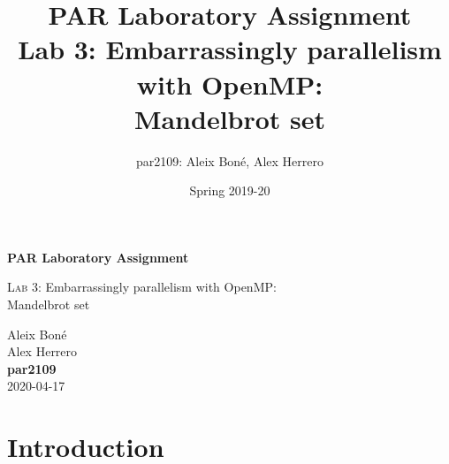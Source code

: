 

\usepackage[justification=centering]{caption}
\usepackage{subcaption}
\usepackage{graphicx}
\usepackage{enumitem}
\usepackage{lipsum}

\usepackage{siunitx}
\usepackage{hyphenat}

\usepackage{xcolor}


\usepackage[newfloat]{minted}
\captionsetup[listing]{position=top}


\renewcommand\theadfont{\bfseries}

\title{
    PAR Laboratory Assignment\\
    Lab 3: Embarrassingly parallelism with OpenMP:\\ Mandelbrot set
}

\author{
    par2109:
    Aleix Boné,
    Alex Herrero
}

\date{
    Spring 2019-20
}



\thispagestyle{empty}
\clearpage
\setcounter{page}{-1}

\begin{titlepage}
{
    \centering
    \null
    \vfill
    {\Huge \bfseries PAR Laboratory Assignment\par}
    \vspace{3em}
    {\Large {\scshape Lab 3:} Embarrassingly parallelism with OpenMP: \\ Mandelbrot set \par}
    \vfill
\begin{center}
\end{center}
    \vspace{3cm}

    \vfill
    {\raggedleft \Large
        Aleix Boné\\
        Alex Herrero\\
        {\bfseries\ttfamily par2109}\\
        \vspace{4em}
        2020-04-17
        \par}
}
\end{titlepage}

\tableofcontents
\pagebreak


\section{Introduction}%
\label{sec:Introduction}

